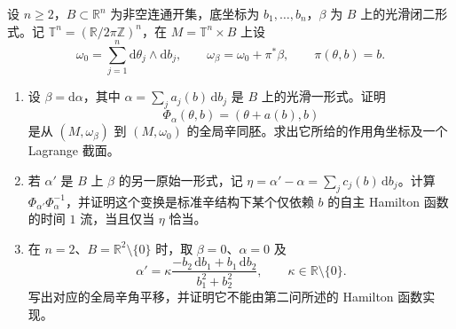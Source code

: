 \begin{exercise}\label{g4:ex:1103:magnetic-section}
	设 \(n\ge2\)，\(B\subset\mathbb R^n\) 为非空连通开集，底坐标为 \(b_1,\ldots,b_n\)，\(\beta\) 为 \(B\) 上的光滑闭二形式。记 \(\mathbb T^n=(\mathbb R/2\pi\mathbb Z)^n\)，在 \(M=\mathbb T^n\times B\) 上设
	\[
		\omega_0=\sum_{j=1}^n\mathrm{d}\theta_j\wedge\mathrm{d}b_j,
		\qquad \omega_\beta=\omega_0+\pi^*\beta,
		\qquad \pi(\theta,b)=b.
	\]
	\begin{enumerate}
		\item 设 \(\beta=\mathrm{d}\alpha\)，其中 \(\alpha=\sum_j a_j(b)\,\mathrm{d}b_j\) 是 \(B\) 上的光滑一形式。证明
		\[
			\Phi_\alpha(\theta,b)=(\theta+a(b),b)
		\]
		是从 \((M,\omega_\beta)\) 到 \((M,\omega_0)\) 的全局辛同胚。求出它所给的作用角坐标及一个 Lagrange 截面。
		\item 若 \(\alpha'\) 是 \(B\) 上 \(\beta\) 的另一原始一形式，记 \(\eta=\alpha'-\alpha=\sum_j c_j(b)\,\mathrm{d}b_j\)。计算 \(\Phi_{\alpha'}\Phi_\alpha^{-1}\)，并证明这个变换是标准辛结构下某个仅依赖 \(b\) 的自主 Hamilton 函数的时间 \(1\) 流，当且仅当 \(\eta\) 恰当。
		\item 在 \(n=2\)、\(B=\mathbb R^2\setminus\{0\}\) 时，取 \(\beta=0\)、\(\alpha=0\) 及
		\[
			\alpha'=\kappa\frac{-b_2\,\mathrm{d}b_1+b_1\,\mathrm{d}b_2}{b_1^2+b_2^2},
			\qquad \kappa\in\mathbb R\setminus\{0\}.
		\]
		写出对应的全局辛角平移，并证明它不能由第二问所述的 Hamilton 函数实现。
	\end{enumerate}
\end{exercise}
